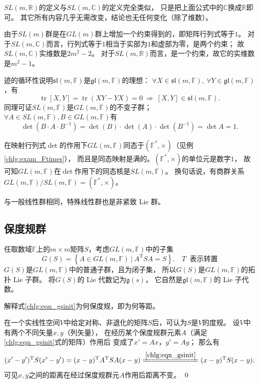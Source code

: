 $SL(m,\mathbb{R})$的定义与$SL(m,\mathbb{C})$的定义完全类似，
只是把上面公式中的$\mathbb{C}$换成$\mathbb{R}$即可。
其它所有内容几乎无需改变，结论也无任何变化（除了维数）。

由于$SL(m)$群是在$GL(m)$群上增加一个约束得到的，即矩阵行列式等于$1$。
对于$SL(m,\mathbb{C})$而言，行列式等于$1$相当于实部为$1$和虚部为零，是两个约束；
故$SL(m,\mathbb{C})$实维数是$2m^2 -2$。
对于$SL(m,\mathbb{R})$而言，是一个约束，故它的实维数是$m^2-1$。

迹的循环性说明$\mathfrak{sl}(m,\mathbb F)$是$\mathfrak{gl}(m,\mathbb F)$的理想：
$\forall X \in \mathfrak{sl}(m,\mathbb{F}), \  \forall Y \in \mathfrak{gl}(m,\mathbb{F})$，有
\begin{equation}
    \operatorname{tr}[X,Y]=\operatorname{tr}(XY-YX) = 0 \ \Rightarrow \
    [X,Y] \in \mathfrak{sl}(m,\mathbb{F}).
\end{equation}
同理可证$SL(m,\mathbb{F})$是$GL(m,\mathbb{F})$的{不变子群}；
$\forall A \in SL(m,\mathbb{F}),  B \in GL(m,\mathbb{F})$有
\begin{equation}
    \det\left(B\cdot A \cdot B^{-1}\right)
    =\det\left(B\right)\cdot\det\left(A\right)\cdot\det\left(B^{-1}\right)
    =\det A =1.
\end{equation}

在映射行列式$\det$的作用下$GL(m,\mathbb{F})$同态于$(\mathbb{F}^*,\times)$（见例\ref{chlg:exam_Ftimes}），
而且是同态映射是满的。$(\mathbb{F}^*,\times)$的单位元是数字$1$，
故可知$GL(m,\mathbb{F})$在$\det$作用下的同态核是$SL(m,\mathbb{F})$。
换句话说，有商群关系$GL(m,\mathbb{F})/SL(m,\mathbb{F})=(\mathbb{F}^*,\times)$。

与一般线性群相同，特殊线性群也是非紧致 Lie 群。

\subsection{保度规群}\label{chlg:sec_isometry}

任取数域$\mathbb{F}$上的$m\times m$矩阵$S$，考虑$GL(m,\mathbb{F})$中的子集
\begin{equation}\label{chlg:eqn_gsinit}
    G(S)= \left\{ A \in GL(m,\mathbb{F})\ |\  A^{\mathrm{T}} S {A} =S \right\}.
    \quad  T\ \text{ 表示转置}
\end{equation}
$G(S)$是$GL(m,\mathbb{F})$中的普通子群，且为闭子集，
所以$G(S)$是$GL(m,\mathbb{F})$的拓扑 Lie 子群。
将$G(S)$的 Lie 代数记为$\mathfrak{g}(s)$，
它自然是$\mathfrak{gl}(m,\mathbb{F})$的 Lie 子代数。

\begin{example}
	解释式\eqref{chlg:eqn_gsinit}为何保度规，即为何等距。

	在一个实线性空间$V$中给定对称、非退化的矩阵$S$后，可认为$S$是$V$的度规。
	设$V$中有两个不同矢量$x,y$（列矢量），
	在经历某个保度规群元素$A$（满足\eqref{chlg:eqn_gsinit}式的矩阵）作用后
	变成了$x'=Ax$，$y'= Ay$；    那么有
	\begin{equation*}
		(x'-y')^{\mathrm{T}} S (x'-y') = (x-y)^{\mathrm{T}} A^{\mathrm{T}} S A (x-y)
		\xlongequal{\ref{chlg:eqn_gsinit}}  (x-y)^{\mathrm{T}} S (x-y).
	\end{equation*}
	可见$x,y$之间的距离在经过保度规群元$A$作用后{距离不变}。 \qed
\end{example}

